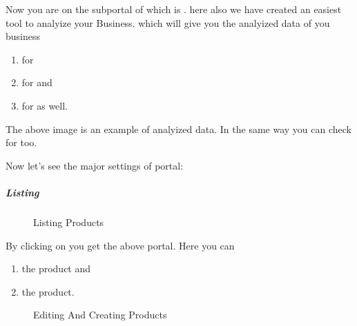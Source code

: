 \documentclass[a4paper,10pt,english]{report}
\begin{document}
Now you are on the subportal of  which is . here also we have created an easiest tool to analyize your Business. which will give you the analyized data of you business
\begin{enumerate}
\def\theenumi{\arabic{enumi}}
\def\labelenumi{\theenumi .}
\makeatletter\def\p@enumii{\p@enumi \theenumi .}\makeatother
\item {} 
for 

\item {} 
for  and

\item {} 
for  as well.

\end{enumerate}

\begin{figure}[htbp]
\centering

\noindent{}
\end{figure}

The above image is an example of  analyized data. In the same way you can check for  too.

Now let’s see the major settings of  portal:


\subparagraph{Listing}
\label{\detokenize{listing:listing}}\label{\detokenize{listing::doc}}
\begin{figure}[htbp]
\centering
\capstart

\noindent{}
\caption{Listing Products}\label{\detokenize{listing:id7}}\label{\detokenize{listing:id1}}\end{figure}

By clicking on  you get the above portal. Here you can
\begin{enumerate}
\def\theenumi{\arabic{enumi}}
\def\labelenumi{\theenumi .}
\makeatletter\def\p@enumii{\p@enumi \theenumi .}\makeatother
\item {} 
 the product and

\item {} 
 the product.

\end{enumerate}

\begin{figure}[htbp]
\centering
\capstart

\noindent{}
\caption{Editing And Creating Products}\label{\detokenize{listing:id8}}\label{\detokenize{listing:id2}}\end{figure}
\end{document}
